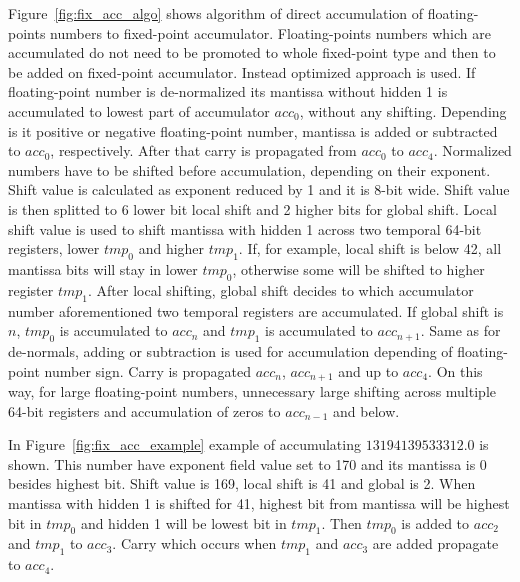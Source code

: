 \documentclass[conference]{IEEEtran}
\begin{document}
\par
Figure~\ref{fig:fix_acc_algo} shows algorithm of direct accumulation of floating-points numbers to fixed-point accumulator.
Floating-points numbers which are accumulated do not need to be promoted to whole fixed-point type 
and then to be added on fixed-point accumulator.
Instead optimized approach is used.
If floating-point number is de-normalized its mantissa without hidden 1 is accumulated to lowest part of accumulator $acc_0$, 
without any shifting.
Depending is it positive or negative floating-point number, mantissa is added or subtracted to $acc_0$, respectively.
After that carry is propagated from $acc_0$ to $acc_4$.
Normalized numbers have to be shifted before accumulation, depending on their exponent. 
Shift value is calculated as exponent reduced by 1 and it is 8-bit wide.
Shift value is then splitted to 6 lower bit local shift and 2 higher bits for global shift.
Local shift value is used to shift mantissa with hidden 1 across two temporal 64-bit registers, 
lower $tmp_0$ and higher $tmp_1$.
If, for example, local shift is below 42, all mantissa bits will stay in lower $tmp_0$, 
otherwise some will be shifted to higher register $tmp_1$.
After local shifting, global shift decides to which accumulator number aforementioned two temporal registers are accumulated.
If global shift is $n$, $tmp_0$ is accumulated to $acc_n$
and $tmp_1$ is accumulated to $acc_{n+1}$.
Same as for de-normals, adding or subtraction is used for accumulation depending of floating-point number sign.
Carry is propagated $acc_n$, $acc_{n+1}$ and up to $acc_4$.
On this way, for large floating-point numbers,
unnecessary large shifting across multiple 64-bit registers and accumulation of zeros to $acc_{n-1}$ and below.
\par
In Figure~\ref{fig:fix_acc_example} example of accumulating $13194139533312.0$ is shown. 
This number have exponent field value set to 170 and its mantissa is 0 besides highest bit.
Shift value is 169, local shift is 41 and global is 2.
When mantissa with hidden 1 is shifted for 41, highest bit from mantissa will be highest bit in $tmp_0$
and hidden 1 will be lowest bit in $tmp_1$.
Then $tmp_0$ is added to $acc_2$ and $tmp_1$ to $acc_3$.
Carry which occurs when $tmp_1$ and $acc_3$ are added propagate to $acc_4$.
\end{document}
